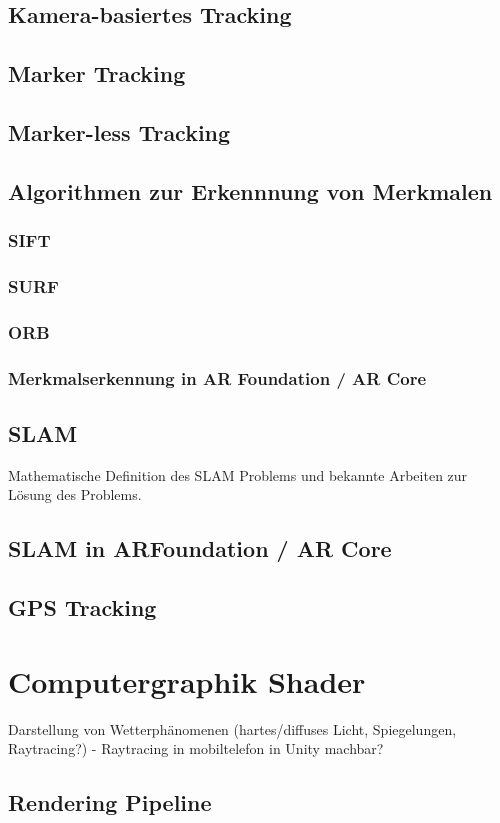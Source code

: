 \subsection{Kamera-basiertes Tracking}
\subsection{Marker Tracking}
\subsection{Marker-less Tracking}
\subsection{Algorithmen zur Erkennnung von Merkmalen}
\subsubsection{SIFT}
\subsubsection{SURF}
\subsubsection{ORB}
\subsubsection{Merkmalserkennung in AR Foundation / AR Core}
\subsection{SLAM}
Mathematische Definition des SLAM Problems und bekannte Arbeiten zur Lösung des Problems.
\subsection{SLAM in ARFoundation / AR Core}
\subsection{GPS Tracking}


\section{Computergraphik Shader}
Darstellung von Wetterphänomenen (hartes/diffuses Licht, Spiegelungen, Raytracing?)
- Raytracing in mobiltelefon in Unity machbar?
\subsection{Rendering Pipeline}
